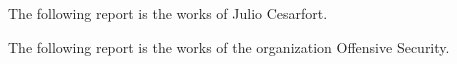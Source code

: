 \documentclass[12pt]{extarticle}
\begin{document}
\pagebreak
\begin{LARGE}
The following report is the works of Julio Cesarfort.\\ \cite{Ref:Sample1}
\end{LARGE}
\pagebreak
{}
\label{example1}

\pagebreak
\begin{LARGE}
\noindent The following report is the works of the organization Offensive Security.\\ \cite{Ref:Sample2}
\end{LARGE}
\pagebreak
\label{example2}

 
 
\end{document}
